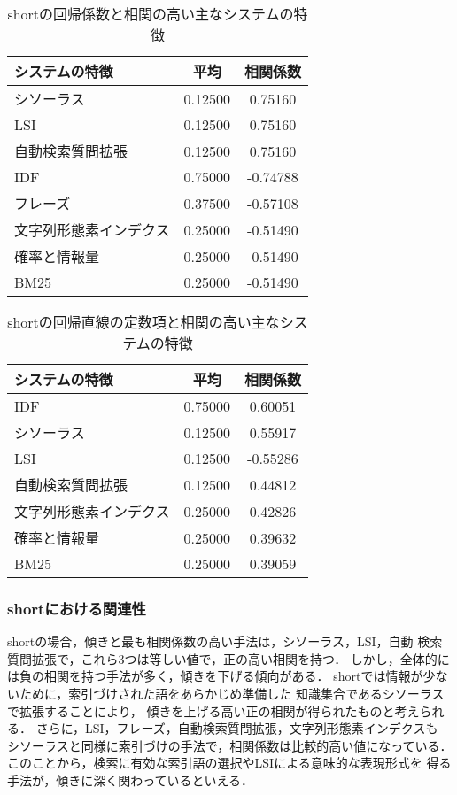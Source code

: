 \begin{table}[t]
\renewcommand{\arraystretch}{}
\caption{shortの回帰係数と相関の高い主なシステムの特徴}
\centering
\small
\label{coe_s_sys}
\begin{tabular}{lcc} 
システムの特徴 		&   平均  & 相関係数 \\ \hline
シソーラス		& 0.12500 &  0.75160 \\
LSI      		& 0.12500 &  0.75160 \\
自動検索質問拡張	& 0.12500 &  0.75160 \\
IDF      		& 0.75000 & -0.74788 \\
フレーズ        	& 0.37500 & -0.57108 \\
文字列形態素インデクス  & 0.25000 & -0.51490 \\
確率と情報量	 	& 0.25000 & -0.51490 \\
BM25	 		& 0.25000 & -0.51490 \\ \hline
\end{tabular}
\end{table}

\begin{table}[t]
\renewcommand{\arraystretch}{}
\caption{shortの回帰直線の定数項と相関の高い主なシステムの特徴}
\centering
\small
\label{con_s_sys}
\begin{tabular}{lcc} 
システムの特徴 		&   平均  & 相関係数\\ \hline
IDF		 	& 0.75000 &  0.60051\\
シソーラス		& 0.12500 &  0.55917\\
LSI	 		& 0.12500 & -0.55286\\
自動検索質問拡張        & 0.12500 &  0.44812\\
文字列形態素インデクス 	& 0.25000 &  0.42826\\
確率と情報量		& 0.25000 &  0.39632\\
BM25            	& 0.25000 &  0.39059\\ \hline
\end{tabular}
\end{table}

\subsubsection*{shortにおける関連性}
shortの場合，傾きと最も相関係数の高い手法は，シソーラス，LSI，自動
検索質問拡張で，これら3つは等しい値で，正の高い相関を持つ．
しかし，全体的には負の相関を持つ手法が多く，傾きを下げる傾向がある．
shortでは情報が少ないために，索引づけされた語をあらかじめ準備した
知識集合であるシソーラスで拡張することにより，
傾きを上げる高い正の相関が得られたものと考えられる．
さらに，LSI，フレーズ，自動検索質問拡張，文字列形態素インデクスも
シソーラスと同様に索引づけの手法で，相関係数は比較的高い値になっている．
このことから，検索に有効な索引語の選択やLSIによる意味的な表現形式を
得る手法が，傾きに深く関わっているといえる．


